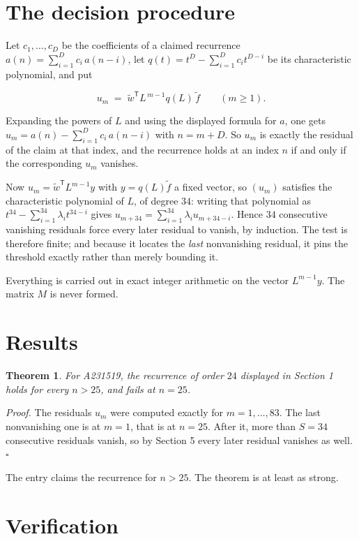 \documentclass[11pt]{article}
\newtheorem{theorem}{Theorem}
\theoremstyle{definition}
\begin{document}
\section{The decision procedure}

Let $c_1,\dots,c_D$ be the coefficients of a claimed recurrence $a(n) = \sum_{i=1}^{D} c_i\,a(n-i)$, let $q(t) = t^{D} - \sum_{i=1}^{D} c_i t^{D-i}$ be its characteristic polynomial, and put

\[u_m \;=\; \tilde w^{\mathsf T} L^{\,m-1} q(L)\,\tilde f \qquad (m \ge 1).\]

Expanding the powers of $L$ and using the displayed formula for $a$, one gets $u_m = a(n) - \sum_{i=1}^{D} c_i\,a(n-i)$ with $n = m + D$. So $u_m$ is exactly the residual of the claim at that index, and the recurrence holds at an index $n$ if and only if the corresponding $u_m$ vanishes.

Now $u_m = \tilde w^{\mathsf T} L^{m-1} y$ with $y = q(L)\tilde f$ a fixed vector, so $(u_m)$ satisfies the characteristic polynomial of $L$, of degree $34$: writing that polynomial as $t^{34} - \sum_{i=1}^{34} \lambda_i t^{34-i}$ gives $u_{m+34} = \sum_{i=1}^{34} \lambda_i u_{m+34-i}$. Hence $34$ consecutive vanishing residuals force every later residual to vanish, by induction. The test is therefore finite; and because it locates the {\itshape last} nonvanishing residual, it pins the threshold exactly rather than merely bounding it.

Everything is carried out in exact integer arithmetic on the vector $L^{m-1}y$. The matrix $M$ is never formed.

\section{Results}

\begin{theorem} For A231519, the recurrence of order $24$ displayed in Section 1 holds for every $n > 25$, and fails at $n = 25$.\end{theorem}

{\itshape Proof.} The residuals $u_m$ were computed exactly for $m = 1,\dots,83$. The last nonvanishing one is at $m = 1$, that is at $n = 25$. After it, more than $S = 34$ consecutive residuals vanish, so by Section 5 every later residual vanishes as well. $\square$

The entry claims the recurrence for $n > 25$. The theorem is at least as strong.

\section{Verification}
\end{document}
